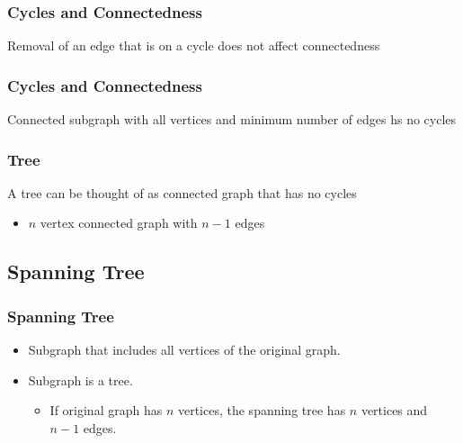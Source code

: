 \documentclass[newPxFont,sthlmFooter,nooffset]{beamer}
\begin{document}
\begin{frame}[t]
  \frametitle{Cycles and Connectedness}
Removal of an edge that is on a cycle does not affect connectedness
\begin{center}
\end{center}
\end{frame}

\begin{frame}[t]
  \frametitle{Cycles and Connectedness}
Connected subgraph with all vertices and minimum number of edges hs no cycles
\begin{center}
\end{center}
\end{frame}


\begin{frame}[t]
  \frametitle{Tree}
A tree can be thought of as connected graph that has no cycles
\begin{itemize}
\item $n$ vertex connected graph with $n-1$ edges
\end{itemize}
\end{frame}





\subsection{Spanning Tree}
\begin{frame}[t]
  \frametitle{Spanning Tree}
  \begin{itemize}
  \item Subgraph that includes all vertices of the original graph.
  \item Subgraph is a tree.
    \begin{itemize}
    \item If original graph has $n$ vertices, the spanning tree has $n$
      vertices and $n-1$ edges.
    \end{itemize}

  \end{itemize}

\end{frame}
\end{document}
